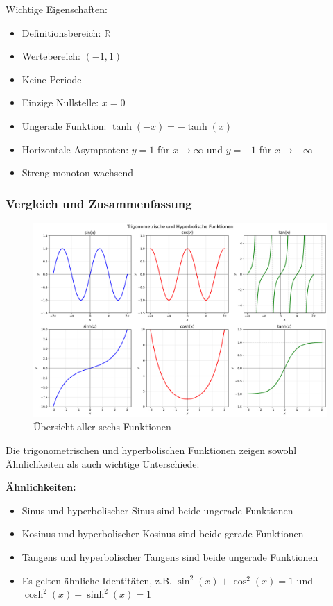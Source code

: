 \documentclass{article}
\begin{document}
Wichtige Eigenschaften:
\begin{itemize}
\item Definitionsbereich: $\mathbb{R}$
\item Wertebereich: $(-1, 1)$
\item Keine Periode
\item Einzige Nullstelle: $x = 0$
\item Ungerade Funktion: $\tanh(-x) = -\tanh(x)$
\item Horizontale Asymptoten: $y = 1$ für $x \to \infty$ und $y = -1$ für $x \to -\infty$
\item Streng monoton wachsend
\end{itemize}

\subsubsection*{Vergleich und Zusammenfassung}

\begin{figure}[!htbp]
\centering
\includegraphics[width=\textwidth]{function_graphs.pdf}
\caption{Übersicht aller sechs Funktionen}
\end{figure}

Die trigonometrischen und hyperbolischen Funktionen zeigen sowohl Ähnlichkeiten als auch wichtige Unterschiede:

\textbf{Ähnlichkeiten:}
\begin{itemize}
\item Sinus und hyperbolischer Sinus sind beide ungerade Funktionen
\item Kosinus und hyperbolischer Kosinus sind beide gerade Funktionen
\item Tangens und hyperbolischer Tangens sind beide ungerade Funktionen
\item Es gelten ähnliche Identitäten, z.B. $\sin^2(x) + \cos^2(x) = 1$ und $\cosh^2(x) - \sinh^2(x) = 1$
\end{itemize}
\end{document}

